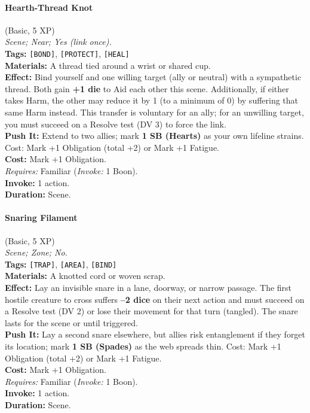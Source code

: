 \paragraph{Hearth-Thread Knot} (Basic, 5 XP) \hfill \\
\emph{Scene; Near; Yes (link once).} \\
\textbf{Tags:} \texttt{[BOND]}, \texttt{[PROTECT]}, \texttt{[HEAL]} \\
\textbf{Materials:} A thread tied around a wrist or shared cup. \\
\textbf{Effect:} Bind yourself and one willing target (ally or neutral) with a sympathetic thread. Both gain \textbf{+1 die} to Aid each other this scene. Additionally, if either takes Harm, the other may reduce it by 1 (to a minimum of 0) by suffering that same Harm instead. This transfer is voluntary for an ally; for an unwilling target, you must succeed on a Resolve test (DV 3) to force the link. \\
\textbf{Push It:} Extend to two allies; mark \textbf{1 SB (Hearts)} as your own lifeline strains. Cost: Mark +1 Obligation (total +2) or Mark +1 Fatigue. \\
\textbf{Cost:} Mark +1 Obligation. \\
\textit{Requires:} Familiar (\textit{Invoke:} 1 Boon). \\
\textbf{Invoke:} 1 action. \\
\textbf{Duration:} Scene.

\paragraph{Snaring Filament} (Basic, 5 XP) \hfill \\
\emph{Scene; Zone; No.} \\
\textbf{Tags:} \texttt{[TRAP]}, \texttt{[AREA]}, \texttt{[BIND]} \\
\textbf{Materials:} A knotted cord or woven scrap. \\
\textbf{Effect:} Lay an invisible snare in a lane, doorway, or narrow passage. The first hostile creature to cross suffers \textbf{--2 dice} on their next action and must succeed on a Resolve test (DV 2) or lose their movement for that turn (tangled). The snare lasts for the scene or until triggered. \\
\textbf{Push It:} Lay a second snare elsewhere, but allies risk entanglement if they forget its location; mark \textbf{1 SB (Spades)} as the web spreads thin. Cost: Mark +1 Obligation (total +2) or Mark +1 Fatigue. \\
\textbf{Cost:} Mark +1 Obligation. \\
\textit{Requires:} Familiar (\textit{Invoke:} 1 Boon). \\
\textbf{Invoke:} 1 action. \\
\textbf{Duration:} Scene.

